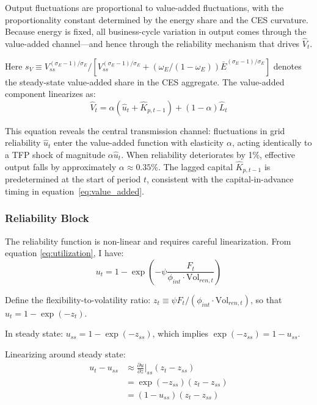 \documentclass[12pt, a4paper]{article}
\begin{document}
Output fluctuations are proportional to value-added fluctuations, with the proportionality constant determined by the energy share and the CES curvature. Because energy is fixed, all business-cycle variation in output comes through the value-added channel---and hence through the reliability mechanism that drives $\hat{V}_t$.

Here $s_V \equiv V_{ss}^{(\sigma_E-1)/\sigma_E} / [V_{ss}^{(\sigma_E-1)/\sigma_E} + (\omega_E/(1-\omega_E)) \bar{E}^{(\sigma_E-1)/\sigma_E}]$ denotes the steady-state value-added share in the CES aggregate. The value-added component linearizes as:
\begin{equation}
\hat{V}_t = \alpha(\hat{u}_t + \hat{K}_{p,t-1}) + (1-\alpha)\hat{L}_t
\label{eq:va_lin}
\end{equation}

This equation reveals the central transmission channel: fluctuations in grid reliability $\hat{u}_t$ enter the value-added function with elasticity $\alpha$, acting identically to a TFP shock of magnitude $\alpha \hat{u}_t$. When reliability deteriorates by 1\%, effective output falls by approximately $\alpha \approx 0.35$\%. The lagged capital $\hat{K}_{p,t-1}$ is predetermined at the start of period $t$, consistent with the capital-in-advance timing in equation~\eqref{eq:value_added}.

\subsubsection{Reliability Block}

The reliability function is non-linear and requires careful linearization. From equation \eqref{eq:utilization}, I have:
\begin{equation}
u_t = 1 - \exp\left(-\psi \frac{F_t}{\phi_{int} \cdot \text{Vol}_{ren,t}}\right)
\end{equation}

Define the flexibility-to-volatility ratio: $z_t \equiv \psi F_t / (\phi_{int} \cdot \text{Vol}_{ren,t})$, so that $u_t = 1 - \exp(-z_t)$.

In steady state: $u_{ss} = 1 - \exp(-z_{ss})$, which implies $\exp(-z_{ss}) = 1 - u_{ss}$.

Linearizing around steady state:
\begin{align}
u_t - u_{ss} &\approx \frac{\partial u}{\partial z}\bigg|_{ss} (z_t - z_{ss}) \\
&= \exp(-z_{ss}) (z_t - z_{ss}) \\
&= (1 - u_{ss})(z_t - z_{ss})
\end{align}
\end{document}
